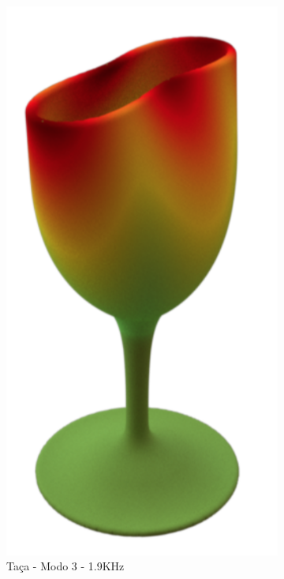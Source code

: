 \begin{figure}[ht]
\begin{subfigure}{0.32\textwidth}
	\centering
	\includegraphics[height=0.2\textheight]{mathematicalbackground/modes/glass_3.png}
	\caption{Taça - Modo 3 - 1.9KHz}\label{fig:glass_3}
\end{subfigure}%
\begin{subfigure}{0.32\textwidth}
	\centering

\end{subfigure}
\end{figure}
